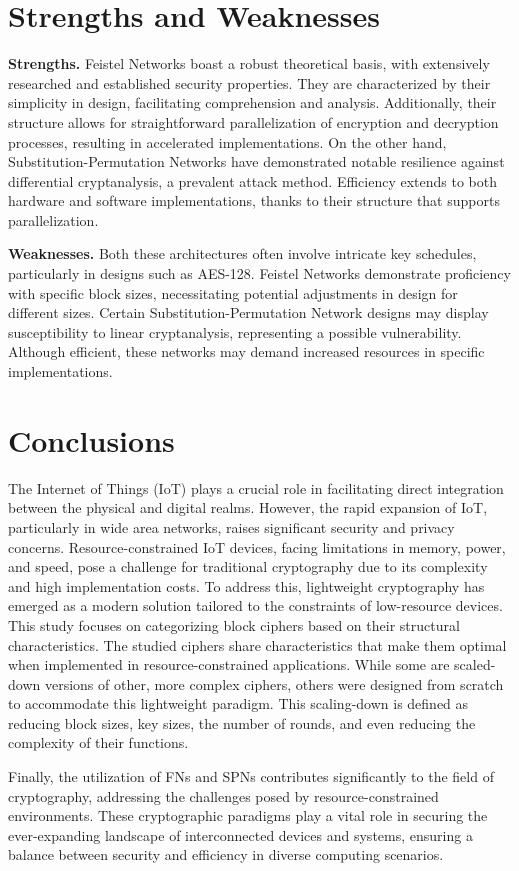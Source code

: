 \documentclass[conference,compsoc]{IEEEtran}
\begin{document}
\section{Strengths and Weaknesses}
\textbf{Strengths.} Feistel Networks boast a robust theoretical basis, with extensively researched and established security properties. They are characterized by their simplicity in design, facilitating comprehension and analysis. Additionally, their structure allows for straightforward parallelization of encryption and decryption processes, resulting in accelerated implementations.
On the other hand, Substitution-Permutation Networks have demonstrated notable resilience against differential cryptanalysis, a prevalent attack method. Efficiency extends to both hardware and software implementations, thanks to their structure that supports parallelization.

\textbf{Weaknesses.} Both these architectures often involve intricate key schedules, particularly in designs such as AES-128. Feistel Networks demonstrate proficiency with specific block sizes, necessitating potential adjustments in design for different sizes. Certain Substitution-Permutation Network designs may display susceptibility to linear cryptanalysis, representing a possible vulnerability. Although efficient, these networks may demand increased resources in specific implementations\cite{FEISTEL}\cite{heys1996substitution}.


\section{Conclusions}
The Internet of Things (IoT) plays a crucial role in facilitating direct integration between the physical and digital realms. However, the rapid expansion of IoT, particularly in wide area networks, raises significant security and privacy concerns. Resource-constrained IoT devices, facing limitations in memory, power, and speed, pose a challenge for traditional cryptography due to its complexity and high implementation costs. To address this, lightweight cryptography has emerged as a modern solution tailored to the constraints of low-resource devices. This study focuses on categorizing block ciphers based on their structural characteristics. The studied ciphers share characteristics that make them optimal when implemented in resource-constrained applications. While some are scaled-down versions of other, more complex ciphers, others were designed from scratch to accommodate this lightweight paradigm. This scaling-down is defined as reducing block sizes, key sizes, the number of rounds, and even reducing the complexity of their functions.

Finally, the utilization of FNs and SPNs contributes significantly to the field of cryptography, addressing the challenges posed by resource-constrained environments. These cryptographic paradigms play a vital role in securing the ever-expanding landscape of interconnected devices and systems, ensuring a balance between security and efficiency in diverse computing scenarios.



\end{document}
